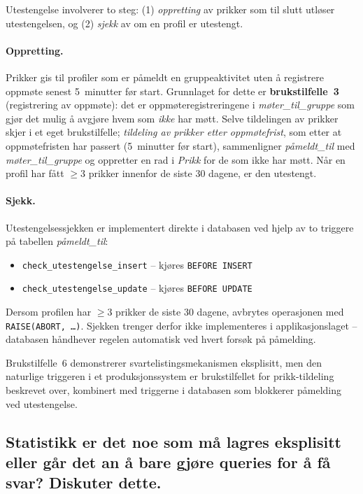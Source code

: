 Utestengelse involverer to steg: (1) \emph{oppretting} av prikker som
til slutt utløser utestengelsen, og (2) \emph{sjekk} av om en profil
er utestengt.

\paragraph{Oppretting.}
Prikker gis til profiler som er påmeldt en gruppeaktivitet uten å
registrere oppmøte senest 5~minutter før start.
Grunnlaget for dette er \textbf{brukstilfelle~3} (registrering av
oppmøte): det er oppmøteregistreringene i \textit{møter\_til\_gruppe}
som gjør det mulig å avgjøre hvem som \emph{ikke} har møtt.
Selve tildelingen av prikker skjer i et eget brukstilfelle;
\emph{tildeling av prikker etter oppmøtefrist},
som etter at oppmøtefristen har passert (5~minutter før start),
sammenligner \textit{påmeldt\_til} med \textit{møter\_til\_gruppe}
og oppretter en rad i \textit{Prikk} for de som ikke har møtt.
Når en profil har fått $\geq 3$ prikker innenfor de siste 30 dagene,
er den utestengt.

\paragraph{Sjekk.}
Utestengelsessjekken er implementert direkte i databasen ved hjelp av
to triggere på tabellen \textit{påmeldt\_til}:
\begin{itemize}
    \item \texttt{check\_utestengelse\_insert} – kjøres \texttt{BEFORE INSERT}
    \item \texttt{check\_utestengelse\_update} – kjøres \texttt{BEFORE UPDATE}
\end{itemize}
Dersom profilen har $\geq 3$ prikker de siste 30 dagene, avbrytes
operasjonen med \texttt{RAISE(ABORT, \ldots)}.
Sjekken trenger derfor ikke implementeres i applikasjonslaget
– databasen håndhever regelen automatisk ved hvert forsøk på påmelding.

Brukstilfelle~6 demonstrerer svartelistingsmekanismen eksplisitt, men
den naturlige triggeren i et produksjonssystem er brukstilfellet for
prikk-tildeling beskrevet over, kombinert med triggerne i databasen
som blokkerer påmelding ved utestengelse.

\subsection{Statistikk er det noe som må lagres eksplisitt eller går det an å bare gjøre queries
for å få svar? Diskuter dette.}

